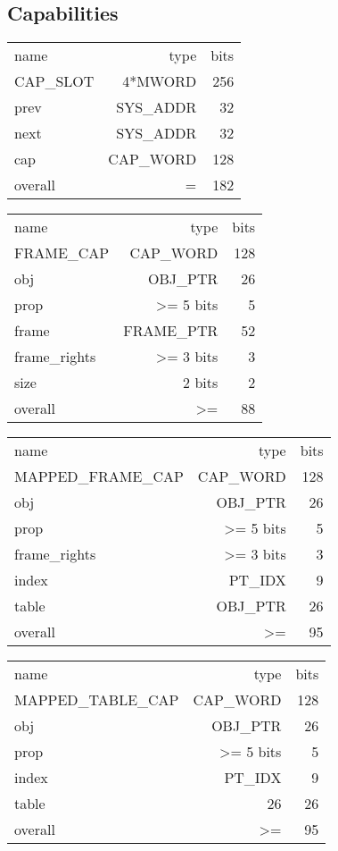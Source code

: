 \subsection{Capabilities}

\begin{tabular}{LRr}
\toprule
name & type & bits \\
CAP_SLOT & 4*MWORD & 256 \\
\midrule 
prev & SYS_ADDR & 32 \\
next & SYS_ADDR & 32 \\
cap & CAP_WORD &  128\\
\midrule
overall & = & 182\\
\bottomrule
\end{tabular}

\begin{tabular}{LRr}
\toprule
name & type & bits \\
FRAME_CAP & CAP_WORD & 128 \\
\midrule 
obj & OBJ_PTR & 26 \\
prop & >= 5 bits & 5 \\
\midrule 
frame & FRAME_PTR & 52 \\
frame_rights & >= 3 bits & 3 \\
size & 2 bits & 2 \\
\midrule
overall & >= & 88\\
\bottomrule
\end{tabular}


\begin{tabular}{LRr}
\toprule
name & type & bits \\
MAPPED_FRAME_CAP & CAP_WORD & 128 \\
\midrule 
obj & OBJ_PTR & 26 \\
prop & >= 5 bits & 5 \\
\midrule
frame_rights & >= 3 bits & 3 \\
index & PT_IDX & 9 \\
table & OBJ_PTR & 26 \\
\midrule
overall & >= & 95\\
\bottomrule
\end{tabular}


\begin{tabular}{LRr}
\toprule
name & type & bits \\
MAPPED_TABLE_CAP & CAP_WORD & 128 \\
\midrule 
obj & OBJ_PTR & 26 \\
prop & >= 5 bits & 5 \\
\midrule
index & PT_IDX & 9 \\
table & 26 & 26 \\
\midrule
overall & >= & 95\\
\bottomrule
\end{tabular}